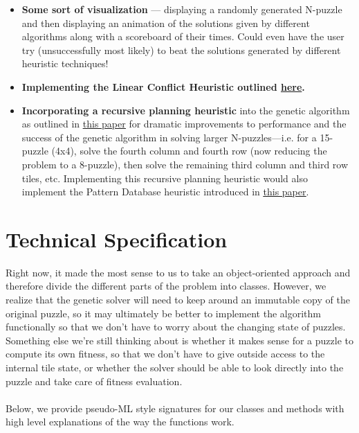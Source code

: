 \documentclass[12pt]{article}
\begin{document}
\begin{itemize}
\item \textbf{Some sort of visualization} — displaying a randomly generated N-puzzle and then displaying an animation of the solutions given by different algorithms along with a scoreboard of their times. Could even have the user try (unsuccessfully most likely) to beat the solutions generated by different heuristic techniques!
	
\item \textbf{Implementing the Linear Conflict Heuristic outlined \href{http://academiccommons.columbia.edu/download/fedora_content/download/ac:141290/CONTENT/cucs-219-85.pdf}{here}.}

\item \textbf{Incorporating a recursive planning heuristic} into the genetic algorithm as outlined in \underline{\href{http://www.engr.colostate.edu/~hj/journals/81.pdf}{this paper}} for dramatic improvements to performance and the success of the genetic algorithm in solving larger N-puzzles—i.e. for a 15-puzzle (4x4), solve the fourth column and fourth row (now reducing the problem to a 8-puzzle), then solve the remaining third column and third row tiles, etc. Implementing this recursive planning heuristic would also implement the Pattern Database heuristic introduced in \underline{\href{http://arxiv.org/pdf/1107.0050.pdf}{this paper}}. 
\end{itemize}									
\section{Technical Specification}
			
Right now, it made the most sense to us to take an object-oriented approach and therefore divide the different parts of the problem into classes. However, we realize that the genetic solver will need to keep around an immutable copy of the original puzzle, so it may ultimately be better to implement the algorithm functionally so that we don’t have to worry about the changing state of puzzles. Something else we’re still thinking about is whether it makes sense for a puzzle to compute its own fitness, so that we don’t have to give outside access to the internal tile state, or whether the solver should be able to look directly into the puzzle and take care of fitness evaluation. \\\\
Below, we provide pseudo-ML style signatures for our classes and methods with high level explanations of the way the functions work. \\

						
\end{document}
